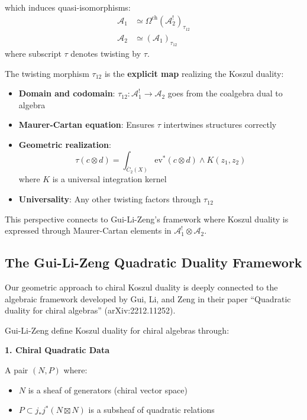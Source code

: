 \begin{example}
\begin{definition}
which induces quasi-isomorphisms:
\begin{align}
\mathcal{A}_1 &\simeq \Omega^{\text{ch}}(\mathcal{A}_2^!)_{\tau_{12}} \\
\mathcal{A}_2 &\simeq (\mathcal{A}_1)_{\tau_{12}}
\end{align}
where subscript $\tau$ denotes twisting by $\tau$.
\end{definition}

\begin{remark}
\label{rem:twisting-perspective}
The twisting morphism $\tau_{12}$ is the \textbf{explicit map} realizing the Koszul duality:
\begin{itemize}
\item \textbf{Domain and codomain}: $\tau_{12}: \mathcal{A}_1^! \to \mathcal{A}_2$ goes 
      from the coalgebra dual to algebra
\item \textbf{Maurer-Cartan equation}: Ensures $\tau$ intertwines structures correctly
\item \textbf{Geometric realization}: 
      $$\tau(c \otimes d) = \int_{\overline{C}_2(X)} \text{ev}^*(c \otimes d) \wedge K(z_1, z_2)$$
      where $K$ is a universal integration kernel
\item \textbf{Universality}: Any other twisting factors through $\tau_{12}$
\end{itemize}

This perspective connects to Gui-Li-Zeng's framework where Koszul duality is expressed 
through Maurer-Cartan elements in $\mathcal{A}_1^! \otimes \mathcal{A}_2$.
\end{remark}

\subsection{The Gui-Li-Zeng Quadratic Duality Framework}
\label{subsec:gui-li-zeng-framework}

Our geometric approach to chiral Koszul duality is deeply connected to the algebraic 
framework developed by Gui, Li, and Zeng in their paper ``Quadratic duality for chiral 
algebras'' \cite{GLZ22} (arXiv:2212.11252).

\begin{framework}
\label{framework:glz}
Gui-Li-Zeng define Koszul duality for chiral algebras through:

\textbf{1. Chiral Quadratic Data}

A pair $(N, P)$ where:
\begin{itemize}
\item $N$ is a sheaf of generators (chiral vector space)
\item $P \subset j_* j^* (N \boxtimes N)$ is a subsheaf of quadratic relations
\end{itemize}


\end{framework}
\end{example}

